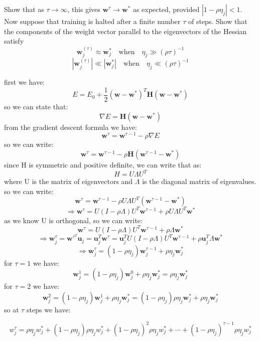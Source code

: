 Show that as \(\tau \to \infty\), this gives \(\mathbf{w}^{\tau} \to \mathbf{w}^*\) as expected, provided \(|1 - \rho \eta_j| < 1\). Now suppose that training is halted after a finite number \(\tau\) of steps. Show that the components of the weight vector parallel to the eigenvectors of the Hessian satisfy
\[
\mathbf{w}_j^{(\tau)} \approx \mathbf{w}_j^* \quad \text{when} \quad \eta_j \gg (\rho \tau)^{-1}
\]
\[
|\mathbf{w}_j^{(\tau)}| \ll |\mathbf{w}_j^*| \quad \text{when} \quad \eta_j \ll (\rho \tau)^{-1}
\]
\begin{qsolve}
    \begin{qsolve}[]
        first we have:
        $$E = E_0 + \frac{1}{2} (\mathbf{w} - \mathbf{w}^*)^T \mathbf{H} (\mathbf{w} - \mathbf{w}^*)$$
        so we can state that:
        $$\nabla E = \mathbf{H} (\mathbf{w} - \mathbf{w}^*)$$
        from the gradient descent formula we have:
        $$\mathbf{w}^{\tau} = \mathbf{w}^{\tau-1} - \rho \nabla E$$
        so we can write:
        $$\mathbf{w}^{\tau} = \mathbf{w}^{\tau-1} - \rho \mathbf{H} (\mathbf{w}^{\tau-1} - \mathbf{w}^*)$$
        since H is symmetric and positive definite, we can write that as:
        $$H = U \Lambda U^T$$
        where U is the matrix of eigenvectors and \(\Lambda\) is the diagonal matrix of eigenvalues. so we can write:
        $$\mathbf{w}^{\tau} = \mathbf{w}^{\tau-1} - \rho U \Lambda U^T (\mathbf{w}^{\tau-1} - \mathbf{w}^*)$$
        \splitqsolve[\splitqsolve]
        $$\Rightarrow \mathbf{w}^{\tau} = U(I-\rho \Lambda)U^T \mathbf{w}^{\tau-1} + \rho U \Lambda U^T \mathbf{w}^*$$
        as we know U is orthogonal, so we can write:
        $$\mathbf{w}^{\tau} = U(I-\rho \Lambda)U^T \mathbf{w}^{\tau-1} + \rho \Lambda \mathbf{w}^*$$
        $$\Rightarrow \mathbf{w}^{\tau}_{j} = \mathbf{w}^{\tau^{T}} \mathbf{u}_j = \mathbf{u}_j^T \mathbf{w}^{\tau} = \mathbf{u}_j^T U(I-\rho \Lambda)U^T \mathbf{w}^{\tau-1} + \rho \mathbf{u}_j^T \Lambda \mathbf{w}^*$$
        $$\Rightarrow \mathbf{w}^{\tau}_{j} = (1-\rho \eta_j) \mathbf{w}^{\tau-1}_{j} + \rho \eta_j \mathbf{w}^*_{j}$$
        for $\tau = 1$ we have:
        $$\mathbf{w}_j^1 = (1-\rho \eta_j) \mathbf{w}_j^0 + \rho \eta_j \mathbf{w}_j^* = \rho \eta_j \mathbf{w}_j^*$$
        for $\tau = 2$ we have:
        $$\mathbf{w}_j^2 = (1-\rho \eta_j) \mathbf{w}_j^1 + \rho \eta_j \mathbf{w}_j^* = (1-\rho \eta_j) \rho \eta_j \mathbf{w}_j^* + \rho \eta_j \mathbf{w}_j^*$$
        so at $\tau$ steps we have:

        \[
        w_j^{\tau} = \rho \eta_j w_j^* + (1 - \rho \eta_j) \rho \eta_j w_j^* + (1 - \rho \eta_j)^2 \rho \eta_j w_j^* + \cdots + (1 - \rho \eta_j)^{\tau-1} \rho \eta_j w_j^*
        \]
        

\end{qsolve}
\end{qsolve}
